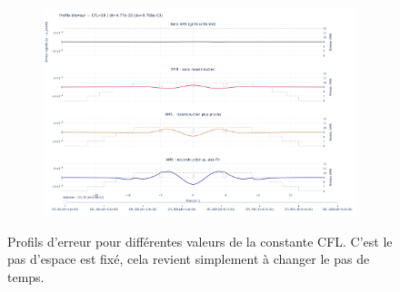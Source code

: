 \begin{figure}[p]
{\begin{minipage}{\textheight}
\begin{subfigure}{0.32\textwidth}
    \includegraphics[width=\linewidth]{media/4_travail/3/03_error_profile_small_cfl.png}
\end{subfigure}

\caption{Profils d'erreur pour différentes valeurs de la constante CFL. C'est le pas d'espace est fixé, 
cela revient simplement à changer le pas de temps.}
\label{fig:error_profiles_landscape}
\end{minipage}%
}
\end{figure}
\clearpage

